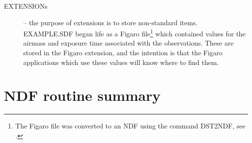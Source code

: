 \documentclass[twoside,11pt,nolof]{starlink}
\begin{document}
\begin{description}
\item[{EXTENSIONs}] -- the purpose of extensions is to store non-standard
items. EXAMPLE.SDF began life as a Figaro file\footnote{The Figaro file was
converted to an NDF using the command DST2NDF, see .}
which contained values
for the airmass and exposure time associated with the observations.
These are stored in the Figaro extension, and the intention is that the
Figaro applications which
use these values will know where to find them.
\end{description}

\newpage
\providecommand{\japp}[2]{\item{\tt\hspace*{-5mm} #1} -- {#2}}
\section{NDF routine summary\label{apxrod}}
\end{document}
